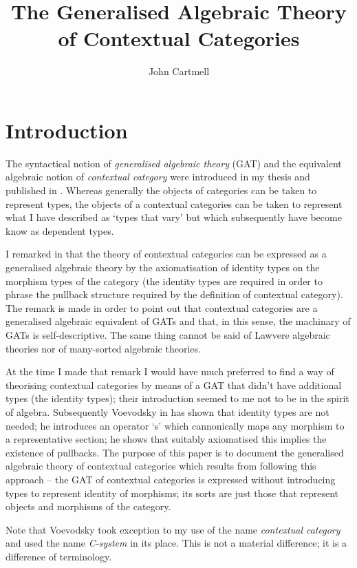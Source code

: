 \documentclass[10pt,a4paper]{article}
\title{The Generalised Algebraic Theory of Contextual Categories}
\author{John Cartmell}
\begin{document}
\maketitle


\section{Introduction}
The syntactical notion of \textit{generalised algebraic theory} (GAT) and the  equivalent algebraic notion of \textit{contextual category} were introduced in my thesis \cite{Cartmell78} and published in \cite{Cartmell86}. Whereas generally the objects of categories can be taken to represent types, the objects of a contextual categories can be taken to represent what I have described as `types that vary' but which subsequently have become know as dependent types. 

I remarked in
\cite{Cartmell78} that the theory of contextual categories can be expressed as a generalised algebraic theory by the axiomatisation of identity types on the morphism types of the category 
(the identity types are required in order to phrase the pullback structure required by the definition of contextual category). The remark is made in order to point out that contextual categories are a generalised algebraic equivalent of GATs and that, in this sense, the machinary of GATs is self-descriptive. The same thing cannot be said of Lawvere algebraic theories nor of many-sorted algebraic theories.  

At the time I made that remark I would have much preferred to find a way of theorising
contextual categories by means of a GAT that didn't have additional types (the identity types);  their introduction seemed to me not to be in the spirit of algebra. 
Subsequently Voevodsky in \cite{Voevodsky14C} has shown that identity types are not needed; he introduces an operator `s' which cannonically maps any morphism to a representative section; he shows that suitably axiomatised this implies the existence of pullbacks.  The purpose of this paper is to document the generalised algebraic theory
of contextual categories which results from following this approach -- the GAT of 
contextual categories is expressed without introducing types to represent identity of morphisms; its sorts are just those that represent objects and morphisms of the category.  

Note that Voevodsky took exception to my use of the name \textit{contextual category} and used
the name \textit{C-system} in its place. This is not a material difference; it is a 
difference of terminology.
\end{document}
